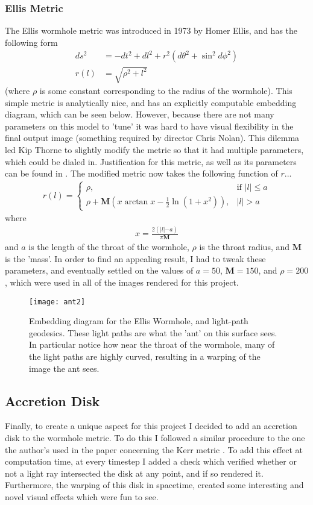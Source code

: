 \documentclass{article}
\begin{document}
\subsubsection{Ellis Metric}
The Ellis wormhole metric was introduced in 1973 by Homer Ellis, and has the following form 
\begin{align*}
ds^2 &= -dt^2+dl^2+r^2(d\theta^2+\sin^2d\phi^2)\\
r(l) &= \sqrt{\rho^2+l^2}
\end{align*}
(where $\rho$ is some constant corresponding to the radius of the wormhole). This simple metric is analytically nice, and has an explicitly computable embedding diagram, which can be seen below. However, because there are not many parameters on this model to 'tune' it was hard to have visual flexibility in the final output image (something required by director Chris Nolan). This dilemma led Kip Thorne to slightly modify the metric so that it had multiple parameters, which could be dialed in. Justification for this metric, as well as its parameters can be found in \cite{viz}. The modified metric now takes the following function of $r$...
\begin{align*}
r(l)= 
\begin{cases}
   \rho, & \text{if } \lvert l \lvert \leq a\\
   \rho+\mathbf{M}(x \arctan x-\frac{1}{2}\ln(1+x^2)), &\lvert l \lvert > a
\end{cases}
\end{align*}
where 
\begin{align*}
x = \frac{2(\lvert l \lvert - a)}{\pi\mathbf{M}}
\end{align*}
and $a$ is the length of the throat of the wormhole, $\rho$ is the throat radius, and $\mathbf{M}$ is the 'mass'. In order to find an appealing result, I had to tweak these parameters, and eventually settled on the values of $a=50$, $\mathbf{M}=150$, and $\rho=200$, which were used in all of the images rendered for this project.

\begin{figure}[H]
  \centering
  \texttt{[image: ant2]}
  \caption{Embedding diagram for the Ellis Wormhole, and light-path geodesics. These light paths are what the 'ant' on this surface sees. In particular notice how near the throat of the wormhole, many of the light paths are highly curved, resulting in a warping of the image the ant sees.}
  \label{fig:mine}
\end{figure}

\subsection{Accretion Disk}
Finally, to create a unique aspect for this project I decided to add an accretion disk to the wormhole metric. To do this I followed a similar procedure to the one the author's used in the paper concerning the Kerr metric \cite{spin}. To add this effect at computation time, at every timestep I added a check which verified whether or not a light ray intersected the disk at any point, and if so rendered it. Furthermore, the warping of this disk in spacetime, created some interesting and novel visual effects which were fun to see.
\end{document}

